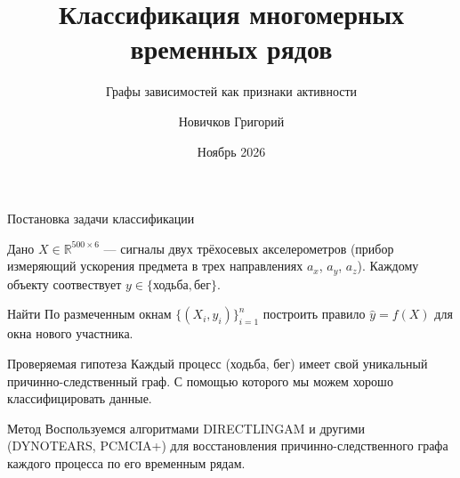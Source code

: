 \documentclass[aspectratio=169]{beamer}
\title{Классификация многомерных временных рядов}
\subtitle{Графы зависимостей как признаки активности}
\author{Новичков Григорий}
\date{Ноябрь 2026}
\begin{document}
\begin{frame}
    \thispagestyle{empty}
    \maketitle
\end{frame}

\begin{frame}{Постановка задачи классификации}
    \small
    \begin{block}{Дано}
        $X\in\mathbb R^{500\times6}$ --- сигналы двух трёхосевых
        акселерометров (прибор измеряющий ускорения предмета в трех направлениях $a_x$, $a_y$, $a_z$). Каждому объекту соотвествует $y\in\{\text{ходьба},\text{бег}\}$.
    \end{block}
    \begin{block}{Найти}
        По размеченным окнам $\{(X_i,y_i)\}_{i=1}^{n}$ построить правило
        $\widehat y=f(X)$ для окна нового участника.
    \end{block}
    \begin{block}{Проверяемая гипотеза}
        Каждый процесс (ходьба, бег) имеет свой уникальный причинно-следственный граф. С помощью которого мы можем хорошо классифицировать данные.
    \end{block}
    \begin{block}{Метод}
        Воспользуемся алгоритмами DIRECTLINGAM и другими (DYNOTEARS, PCMCIA+) для восстановления причинно-следственного графа каждого процесса по его временным рядам.
    \end{block}
\end{frame}
\end{document}
